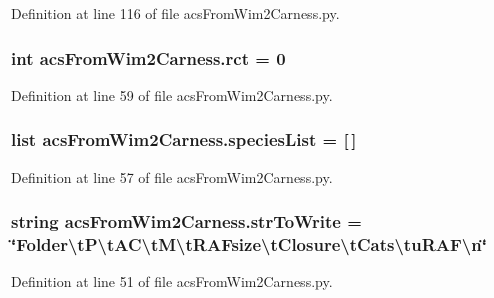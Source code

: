 Definition at line 116 of file acs\-From\-Wim2\-Carness.\-py.

\hypertarget{a00100_a61159eb5aec77b97808ce3fb742d8f6d}{
\subsubsection[{rct}]{\setlength{\rightskip}{0pt plus 5cm}int acs\-From\-Wim2\-Carness.\-rct = 0}}\label{a00100_a61159eb5aec77b97808ce3fb742d8f6d}


Definition at line 59 of file acs\-From\-Wim2\-Carness.\-py.

\hypertarget{a00100_aff8baae5d4cd1678204477dd5e620775}{
\subsubsection[{species\-List}]{\setlength{\rightskip}{0pt plus 5cm}list acs\-From\-Wim2\-Carness.\-species\-List = \mbox{[}$\,$\mbox{]}}}\label{a00100_aff8baae5d4cd1678204477dd5e620775}


Definition at line 57 of file acs\-From\-Wim2\-Carness.\-py.

\hypertarget{a00100_a34b3667c3c217a35a0e9b71458d2b233}{
\subsubsection[{str\-To\-Write}]{\setlength{\rightskip}{0pt plus 5cm}string acs\-From\-Wim2\-Carness.\-str\-To\-Write = \char`\"{}Folder\textbackslash{}t\-P\textbackslash{}t\-A\-C\textbackslash{}t\-M\textbackslash{}t\-R\-A\-Fsize\textbackslash{}t\-Closure\textbackslash{}t\-Cats\textbackslash{}tu\-R\-A\-F\textbackslash{}n\char`\"{}}}\label{a00100_a34b3667c3c217a35a0e9b71458d2b233}


Definition at line 51 of file acs\-From\-Wim2\-Carness.\-py.

